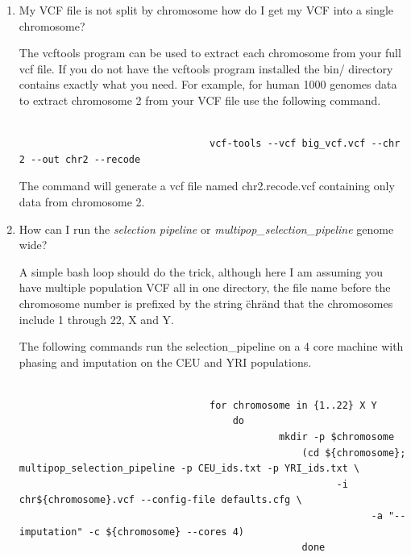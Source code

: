 \documentclass[a4paper,10pt]{article}
\begin{document}
\begin{enumerate}
\begin{verbatim}
                                 \end{verbatim}

                                 \item My VCF file is not split by chromosome how do I get my VCF into a single chromosome?

                                 The vcftools program can be used to extract each chromosome from your
                                 full vcf file. If you do not have the vcftools program installed the
                                 bin/ directory  contains exactly what you need. For example, for human
                                 1000 genomes data to extract chromosome 2 from your VCF file use the
                                 following command. 

                                 \begin{verbatim}

                                 vcf-tools --vcf big_vcf.vcf --chr 2 --out chr2 --recode

                                 \end{verbatim}

                                 The command will generate a vcf file named chr2.recode.vcf containing only data from chromosome 2.

                                 \item How can I run the \emph{selection pipeline} or \emph{multipop\_selection\_pipeline} genome wide?

                                 A simple bash loop should do the trick, although here I am assuming you have multiple population VCF all in one
                                 directory, the file name before the chromosome number is prefixed by the string \"chr\" and that the chromosomes include 1 through 22, X and Y.

                                 The following commands run the selection\_pipeline on a 4 core machine with phasing and imputation on the CEU and YRI populations.

                                 \begin{verbatim}

                                 for chromosome in {1..22} X Y
                                     do
                                             mkdir -p $chromosome
                                                 (cd ${chromosome}; multipop_selection_pipeline -p CEU_ids.txt -p YRI_ids.txt \
                                                       -i chr${chromosome}.vcf --config-file defaults.cfg \
                                                             -a "--imputation" -c ${chromosome} --cores 4)
                                                 done


\end{verbatim}
\end{enumerate}
\end{document}
